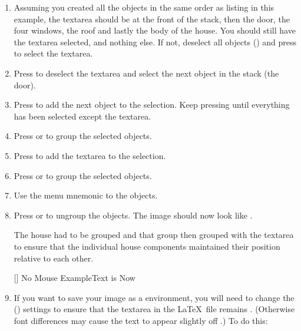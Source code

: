 \begin{enumerate}
\item Assuming you created all the objects in the same order as
listing in this example, the \gls{textarea} should be at
the front of the \gls{stack}, then the door, the four windows, the roof
and lastly the body of the house. You should still have the
\gls{textarea} selected, and nothing else. If not, deselect all
objects () and press 
 to select the \gls{textarea}.

\item Press  to deselect the \gls{textarea} and select
the next object in the \gls{stack} (the door).

\item Press  to add the next object to the selection.
Keep pressing  until everything has been selected except
the \gls{textarea}.

\item Press  or  to
group the selected objects.

\item Press  to add the \gls{textarea} to the selection.

\item Press  or
 to group the selected objects.

\item Use the menu mnemonic
 to  the
objects.

\item Press  or
 to
ungroup the objects. The image should now look like
.

\begin{information}
The house had to be grouped
and that group then grouped with the \gls{textarea} to
ensure that the individual house components maintained their
position relative to each other.
\end{information}

[]
{}
{No Mouse Example\dash Text is Now }

\item If you want to save your image as a 
environment, you will need to change the 
() settings to ensure that the
\gls{textarea} in the \LaTeX\ file remains .
(Otherwise font differences may cause the text to appear slightly
off .) To do this:


\end{enumerate}
